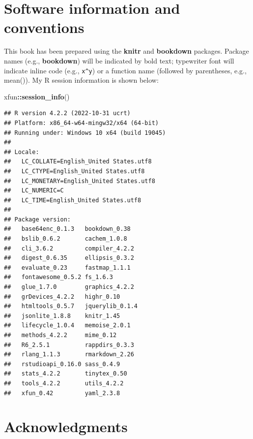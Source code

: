 \documentclass[
]{krantz}
\makeatletter
\newenvironment{Shaded}{\begin{snugshade}}{\end{snugshade}}
\newcommand{\FunctionTok}[1]{\textcolor[rgb]{0.27,0.27,0.27}{\textbf{#1}}}
\newcommand{\NormalTok}[1]{#1}
\newcommand{\SpecialCharTok}[1]{\textcolor[rgb]{0.43,0.43,0.43}{\textbf{#1}}}
\newenvironment{kframe}{%
\medskip{}
\setlength{\fboxsep}{.8em}
 \def\at@end@of@kframe{}%
 \ifinner\ifhmode%
  \def\at@end@of@kframe{\end{minipage}}%
  \begin{minipage}{\columnwidth}%
 \fi\fi%
 \def\FrameCommand##1{\hskip\@totalleftmargin \hskip-\fboxsep
 \colorbox{shadecolor}{##1}\hskip-\fboxsep
     \hskip-\linewidth \hskip-\@totalleftmargin \hskip\columnwidth}%
 \MakeFramed {\advance\hsize-\width
   \@totalleftmargin\z@ \linewidth\hsize
   \@setminipage}}%
 {\par\unskip\endMakeFramed%
 \at@end@of@kframe}
\renewenvironment{Shaded}{\begin{kframe}}{\end{kframe}}
\makeatother
\begin{document}
\hypertarget{software-information-and-conventions}{%
\section*{Software information and conventions}\label{software-information-and-conventions}}


This book has been prepared using the \textbf{knitr} \citep{xie2015} and \textbf{bookdown} \citep{R-bookdown} packages. Package names (e.g., \textbf{bookdown}) will be indicated by bold text; typewriter font will indicate inline code (e.g., \texttt{x\^{}y}) or a function name (followed by parentheses, e.g., mean()). My R session information is shown below:

\begin{Shaded}
\begin{Highlighting}[]
\NormalTok{xfun}\SpecialCharTok{::}\FunctionTok{session\_info}\NormalTok{()}
\end{Highlighting}
\end{Shaded}

\begin{verbatim}
## R version 4.2.2 (2022-10-31 ucrt)
## Platform: x86_64-w64-mingw32/x64 (64-bit)
## Running under: Windows 10 x64 (build 19045)
## 
## Locale:
##   LC_COLLATE=English_United States.utf8 
##   LC_CTYPE=English_United States.utf8   
##   LC_MONETARY=English_United States.utf8
##   LC_NUMERIC=C                          
##   LC_TIME=English_United States.utf8    
## 
## Package version:
##   base64enc_0.1.3   bookdown_0.38    
##   bslib_0.6.2       cachem_1.0.8     
##   cli_3.6.2         compiler_4.2.2   
##   digest_0.6.35     ellipsis_0.3.2   
##   evaluate_0.23     fastmap_1.1.1    
##   fontawesome_0.5.2 fs_1.6.3         
##   glue_1.7.0        graphics_4.2.2   
##   grDevices_4.2.2   highr_0.10       
##   htmltools_0.5.7   jquerylib_0.1.4  
##   jsonlite_1.8.8    knitr_1.45       
##   lifecycle_1.0.4   memoise_2.0.1    
##   methods_4.2.2     mime_0.12        
##   R6_2.5.1          rappdirs_0.3.3   
##   rlang_1.1.3       rmarkdown_2.26   
##   rstudioapi_0.16.0 sass_0.4.9       
##   stats_4.2.2       tinytex_0.50     
##   tools_4.2.2       utils_4.2.2      
##   xfun_0.42         yaml_2.3.8
\end{verbatim}

\hypertarget{acknowledgments}{%
\section*{Acknowledgments}\label{acknowledgments}}
\end{document}
